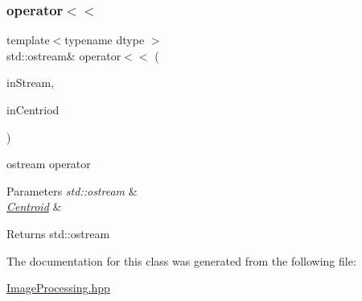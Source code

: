 \subsubsection{\texorpdfstring{operator$<$$<$}{operator<<}}
{\footnotesize\ttfamily template$<$typename dtype $>$ \\
std\+::ostream\& operator$<$$<$ (\begin{DoxyParamCaption}\item[{std\+::ostream \&}]{in\+Stream,  }\item[{const \mbox{\hyperlink{class_num_cpp_1_1_image_processing_1_1_centroid}{Centroid}} \&}]{in\+Centriod }\end{DoxyParamCaption})\hspace{0.3cm}{\ttfamily [friend]}}

ostream operator


\begin{DoxyParams}{Parameters}
{\em std\+::ostream} & \\
\hline
{\em \mbox{\hyperlink{class_num_cpp_1_1_image_processing_1_1_centroid}{Centroid}}} & \\
\hline
\end{DoxyParams}
\begin{DoxyReturn}{Returns}
std\+::ostream 
\end{DoxyReturn}


The documentation for this class was generated from the following file\+:\begin{DoxyCompactItemize}
\item 
\mbox{\hyperlink{_image_processing_8hpp}{Image\+Processing.\+hpp}}\end{DoxyCompactItemize}
